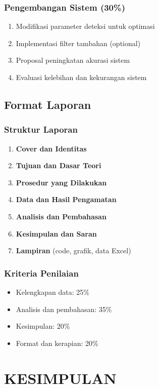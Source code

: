 \documentclass[12pt,a4paper]{article}
\begin{document}
\subsubsection{Pengembangan Sistem (30\%)}
\begin{enumerate}
    \item Modifikasi parameter deteksi untuk optimasi
    \item Implementasi filter tambahan (optional)
    \item Proposal peningkatan akurasi sistem
    \item Evaluasi kelebihan dan kekurangan sistem
\end{enumerate}

\subsection{Format Laporan}

\subsubsection{Struktur Laporan}
\begin{enumerate}
    \item \textbf{Cover dan Identitas}
    \item \textbf{Tujuan dan Dasar Teori}
    \item \textbf{Prosedur yang Dilakukan}
    \item \textbf{Data dan Hasil Pengamatan}
    \item \textbf{Analisis dan Pembahasan}
    \item \textbf{Kesimpulan dan Saran}
    \item \textbf{Lampiran} (code, grafik, data Excel)
\end{enumerate}

\subsubsection{Kriteria Penilaian}
\begin{itemize}
    \item Kelengkapan data: 25\%
    \item Analisis dan pembahasan: 35\%
    \item Kesimpulan: 20\%
    \item Format dan kerapian: 20\%
\end{itemize}

\section{KESIMPULAN}
\end{document}
